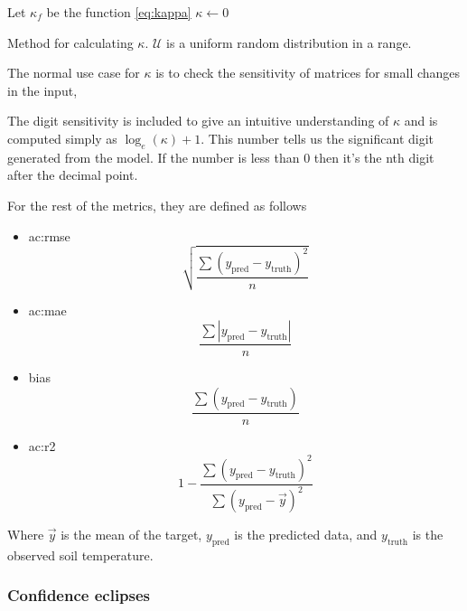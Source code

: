 \begin{algorithm}[H]
	\SetAlgoLined
	Let $\kappa_f$ be the function \ref{eq:kappa}\;
	$\kappa\gets 0$\;
	\Return{$\kappa$}
	\caption[Randommised $\kappa$ algorithm]{Method for calculating $\kappa$. $\mathcal{U}$ is a uniform random distribution in a range.}
	\label{alg:cond_num}
\end{algorithm}

The normal use case for $\kappa$ is to check the sensitivity of matrices for small changes in the input,  

The digit sensitivity is included to give an intuitive understanding of $\kappa$ and is computed simply as $\log_e(\kappa)+1$. This number tells us the significant digit generated from the model. If the number is less than 0 then it's the nth digit after the decimal point.

For the rest of the metrics, they are defined as follows
\begin{itemize}
	\item \gls{ac:rmse} \begin{equation}\sqrt{\frac{\sum (y_{\text{pred}} - y_{\text{truth}})^2}{n}}\end{equation}
	\item \gls{ac:mae} \begin{equation}\frac{\sum \left| y_{\text{pred}} - y_{\text{truth}}\right|}{n}\end{equation}
	\item bias \begin{equation}\frac{\sum ( y_{\text{pred}} - y_{\text{truth}})}{n}\end{equation}
	\item \gls{ac:r2} \begin{equation}1-\frac{\sum (y_{\text{pred}} - y_{\text{truth}})^2}{\sum (y_{\text{pred}} - \vec{y})^2}\end{equation}
\end{itemize}

Where $\vec{y}$ is the mean of the target, $y_{\text{pred}}$ is the predicted data, and $y_{\text{truth}}$ is the observed soil temperature.

\subsubsection{Confidence eclipses}\label{sec:method:eclipse}

